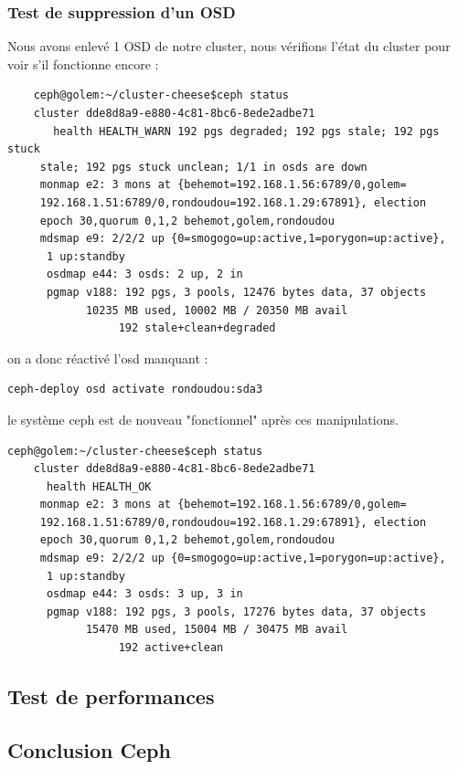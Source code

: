 \documentclass[12pt]{article}
\begin{document}
	\subsubsection{Test de suppression d'un OSD}
	Nous avons enlevé 1 OSD de notre cluster, nous vérifions l'état du cluster pour voir s'il fonctionne encore :
	
	\begin{verbatim}
	ceph@golem:~/cluster-cheese$ceph status     
    cluster dde8d8a9-e880-4c81-8bc6-8ede2adbe71
       health HEALTH_WARN 192 pgs degraded; 192 pgs stale; 192 pgs stuck
     stale; 192 pgs stuck unclean; 1/1 in osds are down  
     monmap e2: 3 mons at {behemot=192.168.1.56:6789/0,golem=
     192.168.1.51:6789/0,rondoudou=192.168.1.29:67891}, election 
     epoch 30,quorum 0,1,2 behemot,golem,rondoudou 
     mdsmap e9: 2/2/2 up {0=smogogo=up:active,1=porygon=up:active},
      1 up:standby
      osdmap e44: 3 osds: 2 up, 2 in 
      pgmap v188: 192 pgs, 3 pools, 12476 bytes data, 37 objects 
            10235 MB used, 10002 MB / 20350 MB avail 
                 192 stale+clean+degraded
\end{verbatim}	 

on a donc réactivé l'osd manquant :
\begin{verbatim}
ceph-deploy osd activate rondoudou:sda3
\end{verbatim}
le système ceph est de nouveau "fonctionnel" après ces manipulations. 
\begin{verbatim}
ceph@golem:~/cluster-cheese$ceph status     
    cluster dde8d8a9-e880-4c81-8bc6-8ede2adbe71
      health HEALTH_OK  
     monmap e2: 3 mons at {behemot=192.168.1.56:6789/0,golem=
     192.168.1.51:6789/0,rondoudou=192.168.1.29:67891}, election 
     epoch 30,quorum 0,1,2 behemot,golem,rondoudou 
     mdsmap e9: 2/2/2 up {0=smogogo=up:active,1=porygon=up:active},
      1 up:standby
      osdmap e44: 3 osds: 3 up, 3 in 
      pgmap v188: 192 pgs, 3 pools, 17276 bytes data, 37 objects 
            15470 MB used, 15004 MB / 30475 MB avail 
                 192 active+clean 
\end{verbatim}
    
	\subsection{Test de performances}
	
	
  
\subsection{Conclusion Ceph}
\newpage
\end{document}
